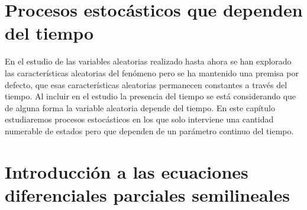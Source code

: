 \documentclass[a4paper,11pt]{book}
\begin{document}
\chapter{Procesos estocásticos que dependen del tiempo}
    En el estudio de las variables aleatorias realizado hasta ahora se han explorado las características aleatorias del fenómeno pero se ha mantenido una premisa por defecto, que esas
    características aleatorias permanecen constantes a través del tiempo. Al incluir en el estudio la presencia del tiempo se está considerando que de alguna forma la variable aleatoria depende del tiempo.
    En este capítulo estudiaremos procesos estocásticos en los que solo interviene una cantidad numerable de estados pero que dependen de un parámetro continuo del tiempo.
    
    
    
    
    

\chapter{Introducción a las ecuaciones diferenciales parciales semilineales}

    
    
    
    
\end{document}
